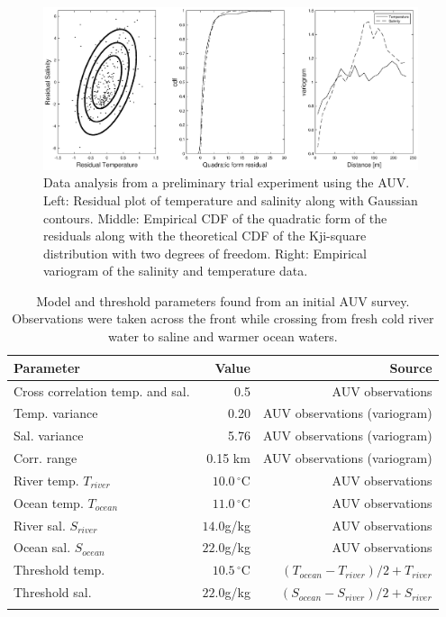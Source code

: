 \documentclass[aoas]{imsart}
\begin{document}
\begin{figure}[!h] 
 \centering 
\includegraphics[width=0.98\textwidth]{Figures/field-trials/res_diag.eps}
\caption{Data analysis from a preliminary trial experiment using the
  AUV. Left: Residual plot of temperature and salinity along with
  Gaussian contours. Middle: Empirical CDF of the quadratic form of
  the residuals along with the theoretical CDF of the Kji-square
  distribution with two degrees of freedom. Right: Empirical variogram
  of the salinity and temperature data.} \label{fig:parest}
\end{figure}

\begin{table}[!h]
\centering
\begin{tabular}{lrr}
\toprule
Parameter & Value & Source\\
\midrule
\rowcolor{Gray}
Cross correlation temp. and sal. & 0.5 & AUV observations\\
Temp. variance &  0.20 & AUV observations (variogram)\\
\rowcolor{Gray}
Sal. variance &  5.76 & AUV observations (variogram)\\
Corr. range  & 0.15 km & AUV observations (variogram)\\
\rowcolor{Gray}
River temp. $T_{river}$ & $10.0\,^{\circ}\mathrm{C}$ & AUV observations\\
Ocean temp. $T_{ocean}$ & $11.0\,^{\circ}\mathrm{C}$ & AUV observations\\
\rowcolor{Gray}
River sal. $S_{river}$ & $14.0$g/kg & AUV observations\\
Ocean sal. $S_{ocean}$ & $22.0$g/kg & AUV observations\\
\rowcolor{Gray}
Threshold temp. & $10.5\,^{\circ}\mathrm{C}$ & $(T_{ocean}-T_{river})/2+T_{river}$\\
Threshold sal. & $22.0$g/kg & $(S_{ocean}-S_{river})/2+S_{river}$\\
\rowcolor{Gray}
\bottomrule
\end{tabular}
\caption{Model and threshold parameters found from an initial AUV
  survey. Observations were taken across the front while crossing from
  fresh cold river water to saline and warmer ocean waters.}
\label{tab:experiment_param}
\end{table}
\end{document}
